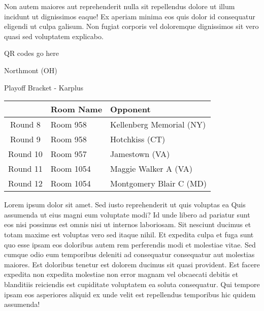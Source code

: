 \documentclass{article}%
\begin{document}
\newline%
Non autem maiores aut reprehenderit nulla sit repellendus dolore ut illum incidunt ut dignissimos eaque! Ex aperiam minima eos quis dolor id consequatur eligendi ut culpa galisum. Non fugiat corporis vel doloremque dignissimos sit vero quasi sed voluptatem explicabo.\newline%
\newline%
%
\vspace*{30pt}%
\begin{center}%
\begin{Huge}%
QR codes go here%
\end{Huge}%
\end{center}%
\newpage%
\begin{center}%
\begin{Huge}%
Northmont (OH)%
\end{Huge}%
\vspace*{8pt}%
\linebreak%
\begin{Large}%
Playoff Bracket {-} Karplus%
\end{Large}%
\end{center}%
\begin{tabularx}{\textwidth}{|c|Y|Y|}%
\hline%
&Room Name&Opponent\\%
\hline%
Round 8&Room 958&Kellenberg Memorial (NY)\\%
Round 9&Room 958&Hotchkiss (CT)\\%
Round 10&Room 957&Jamestown (VA)\\%
Round 11&Room 1054&Maggie Walker A (VA)\\%
Round 12&Room 1054&Montgomery Blair C (MD)\\%
\hline%
\end{tabularx}%
\vspace*{8pt}%
\linebreak%
\newline%
\newline%
Lorem ipsum dolor sit amet. Sed iusto reprehenderit ut quis voluptas ea Quis assumenda ut eius magni eum voluptate modi? Id unde libero ad pariatur sunt eos nisi possimus est omnis nisi ut internos laboriosam. Sit nesciunt ducimus et totam maxime est voluptas vero sed itaque nihil. Et expedita culpa et fuga sunt quo esse ipsam eos doloribus autem rem perferendis modi et molestiae vitae.\newline%
\newline%
Sed cumque odio eum temporibus deleniti ad consequatur consequatur aut molestias maiores. Est doloribus tenetur est dolorem ducimus sit quasi provident. Est facere expedita non expedita molestiae non error magnam vel obcaecati debitis et blanditiis reiciendis est cupiditate voluptatem ea soluta consequatur. Qui tempore ipsam eos asperiores aliquid ex unde velit est repellendus temporibus hic quidem assumenda!\newline%
\end{document}
